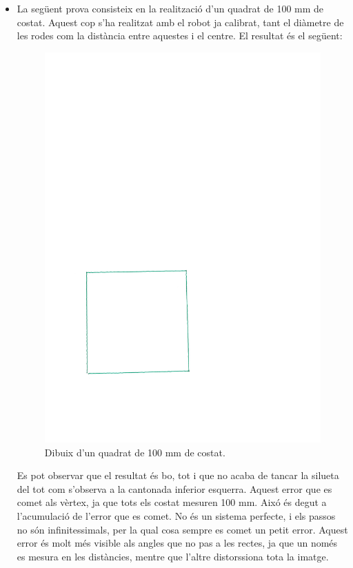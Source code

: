 \begin{itemize}
	\item La següent prova consisteix en la realització d'un quadrat de 100 mm de costat. Aquest cop s'ha realitzat amb el robot ja calibrat, tant el diàmetre de les rodes com la distància entre aquestes i el centre. El resultat és el següent:
	\begin{figure}[H]
		\centering
		\includegraphics{resultatQuadrat}
		\caption{Dibuix d'un quadrat de 100 mm de costat.}
		\label{fig:quadrat}
	\end{figure}
	Es pot observar que el resultat és bo, tot i que no acaba de tancar la silueta del tot com s'observa a la cantonada inferior esquerra. Aquest error que es comet als vèrtex, ja que tots els costat mesuren 100 mm. Aixó és degut a l'acumulació de l'error que es comet. No és un sistema perfecte, i els passos no són infinitessimals, per la qual cosa sempre es comet un petit error. Aquest error és molt més visible als angles que no pas a les rectes, ja que un només es mesura en les distàncies, mentre que l'altre distorssiona tota la imatge. 
	

\end{itemize}
